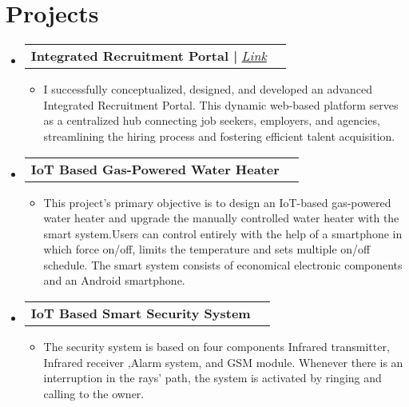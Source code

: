 \documentclass[letterpaper,11pt]{article}
\makeatletter
\newcommand{\resumeItem}[1]{
  \item\small{
    {#1 \vspace{-2pt}}
  }
}
\newcommand{\resumeProjectHeading}[2]{
    \vspace{-2pt}\item
    \begin{tabular*}{0.97\textwidth}{l@{\extracolsep{\fill}}r}
      \small#1 & #2 \\
    \end{tabular*}\vspace{-7pt}
}
\newcommand{\resumeSubHeadingListStart}{\begin{itemize}[leftmargin=0.15in, label={}]}
\newcommand{\resumeSubHeadingListEnd}{\end{itemize}}
\newcommand{\resumeItemListStart}{\begin{itemize}}
\newcommand{\resumeItemListEnd}{\end{itemize}\vspace{-5pt}}
\makeatother
\begin{document}
\section{Projects}
\vspace{3pt}
\resumeSubHeadingListStart

\resumeProjectHeading
{\textbf{Integrated Recruitment Portal | }  \emph{\textcolor[RGB]{20, 80, 255}{\href{https://www.sprostaffing.com/}{Link}}}}  {}
\resumeItemListStart
\resumeItem{I successfully conceptualized, designed, and developed an advanced Integrated Recruitment Portal. This dynamic web-based platform serves as a centralized hub connecting job seekers, employers, and agencies, streamlining the hiring process and fostering efficient talent acquisition.}
\resumeItemListEnd



\resumeProjectHeading
{\textbf{IoT Based Gas-Powered Water Heater} \emph{\href{}{}}}{}
\resumeItemListStart
\resumeItem{This project's primary objective is to design an IoT-based gas-powered water
	heater and upgrade the manually controlled water heater with the smart
	system.Users can control entirely with the help of a smartphone in which force on/off, limits the temperature and sets multiple on/off schedule. The smart system consists of economical electronic components and an Android
	smartphone.}

\resumeItemListEnd

\resumeProjectHeading
{\textbf{IoT Based Smart Security System} \emph{\href{}{}}}{}
\resumeItemListStart
\resumeItem{The security system is based on four components Infrared transmitter, Infrared receiver ,Alarm system, and GSM module. Whenever there is an interruption in the rays' path, the system is activated by ringing and calling to the owner.}

\resumeItemListEnd


\resumeSubHeadingListEnd



\end{document}

